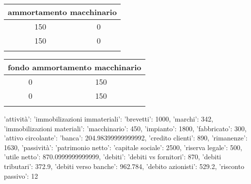 \documentclass[twocolumn]{article}
\begin{document}
\begin{table}[ht]\centering 
\begin{tabular}{|c|c|}
\hline
\multicolumn{2}{|c|}{ammortamento macchinario} \\ 
\hline  \hline 
150 & 0 \\ 
\hline
150 & 0 \\ 
 \\ 
\hline
\end{tabular} \end{table} 
\begin{table}[ht]\centering 
\begin{tabular}{|c|c|}
\hline
\multicolumn{2}{|c|}{fondo ammortamento macchinario} \\ 
\hline  \hline 
0 & 150 \\ 
\hline
0 & 150 \\ 
 \\ 
\hline
\end{tabular} \end{table} 
{'attività': {'immobilizazioni immateriali': {'brevetti': 1000, 'marchi': 342}, 'immobilizazioni materiali': {'macchinario': 450, 'impianto': 1800, 'fabbricato': 300}, 'attivo circolante': {'banca': 204.98399999999992, 'credito clienti': 890, 'rimanenze': 1630}}, 'passività': {'patrimonio netto': {'capitale sociale': 2500, 'riserva legale': 500, 'utile netto': 870.0999999999999}, 'debiti': {'debiti vs fornitori': 870, 'debiti tributari': 372.9, 'debiti verso banche': 962.784, 'debito azionisti': 529.2, 'risconto passivo': 12}}}
\end{document}
